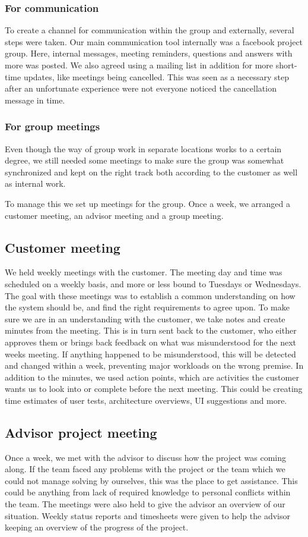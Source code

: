 \documentclass[11pt]{book}
\begin{document}
\subsubsection{For communication}
To create a channel for communication within the group and externally, several steps were taken. Our main communication tool internally was a facebook project group. Here, internal messages, meeting reminders, questions and answers with more was posted. We also agreed using a mailing list in addition for more short-time updates, like meetings being cancelled. This was seen as a necessary step after an unfortunate experience were not everyone noticed the cancellation message in time.

\subsubsection{For group meetings}
Even though the way of group work in separate locations works to a certain degree, we still needed some meetings to make sure the group was somewhat synchronized and kept on the right track both according to the customer as well as internal work.

To manage this we set up meetings for the group. Once a week, we arranged a customer meeting, an advisor meeting and a group meeting.

\subsection{Customer meeting}
We held weekly meetings with the customer. The meeting day and time was scheduled on a weekly basis, and more or less bound to Tuesdays or Wednesdays. The goal with these meetings was to establish a common understanding on how the system should be, and find the right requirements to agree upon. To make sure we are in an understanding with the customer, we take notes and create minutes from the meeting. This is in turn sent back to the customer, who either approves them or brings back feedback on what was misunderstood for the next weeks meeting. If anything happened to be misunderstood, this will be detected and changed within a week, preventing major workloads on the wrong premise. In addition to the minutes, we used action points, which are activities the customer wants us to look into or complete before the next meeting. This could be creating time estimates of user tests, architecture overviews, UI suggestions and more.

\subsection{Advisor project meeting}
Once a week, we met with the advisor to discuss how the project was coming along. If the team faced any problems with the project or the team which we could not manage solving by ourselves, this was the place to get assistance. This could be anything from lack of required knowledge to personal conflicts within the team. The meetings were also held to give the advisor an overview of our situation. Weekly status reports and timesheets were given to help the advisor keeping an overview of the progress of the project.
\end{document}
